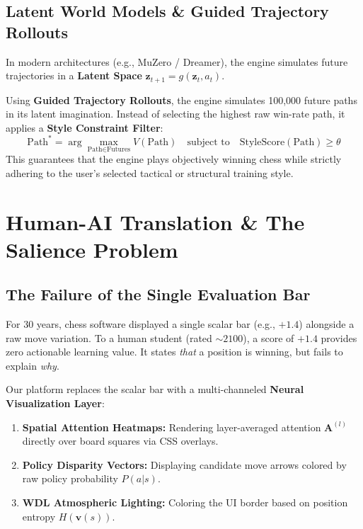 \documentclass[11pt,a4paper]{report}
\begin{document}
\section{Latent World Models \& Guided Trajectory Rollouts}
In modern architectures (e.g., MuZero / Dreamer), the engine simulates future trajectories in a \textbf{Latent Space} $\mathbf{z}_{t+1} = g(\mathbf{z}_t, a_t)$.

Using \textbf{Guided Trajectory Rollouts}, the engine simulates 100,000 future paths in its latent imagination. Instead of selecting the highest raw win-rate path, it applies a \textbf{Style Constraint Filter}:
\begin{equation}
\text{Path}^* = \arg\max_{\text{Path} \in \text{Futures}} V(\text{Path}) \quad \text{subject to} \quad \text{StyleScore}(\text{Path}) \ge \theta
\end{equation}
This guarantees that the engine plays objectively winning chess while strictly adhering to the user's selected tactical or structural training style.

\newpage
\chapter{Human-AI Translation \& The Salience Problem}

\section{The Failure of the Single Evaluation Bar}
For 30 years, chess software displayed a single scalar bar (e.g., $+1.4$) alongside a raw move variation. To a human student (rated $\sim 2100$), a score of $+1.4$ provides zero actionable learning value. It states \textit{that} a position is winning, but fails to explain \textit{why}.

Our platform replaces the scalar bar with a multi-channeled \textbf{Neural Visualization Layer}:
\begin{enumerate}
    \item \textbf{Spatial Attention Heatmaps:} Rendering layer-averaged attention $\mathbf{A}^{(l)}$ directly over board squares via CSS overlays.
    \item \textbf{Policy Disparity Vectors:} Displaying candidate move arrows colored by raw policy probability $P(a|s)$.
    \item \textbf{WDL Atmospheric Lighting:} Coloring the UI border based on position entropy $H(\mathbf{v}(s))$.
\end{enumerate}
\end{document}
